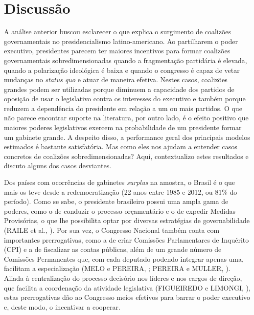 \chapter{Discussão}
\label{chap:discussao}

A análise anterior buscou esclarecer o que explica o surgimento de coalizões governamentais no presidencialismo latino-americano. Ao partilharem o poder executivo, presidentes parecem ter maiores incentivos para formar coalizões governamentais sobredimensionadas quando a fragmentação partidária é elevada, quando a polarização ideológica é baixa e quando o congresso é capaz de vetar mudanças no \textit{status quo} e atuar de maneira efetiva. Nestes casos, coalizões grandes podem ser utilizadas porque diminuem a capacidade dos partidos de oposição de usar o legislativo contra os interesses do executivo e também porque reduzem a dependência do presidente em relação a um ou mais partidos. O que não parece encontrar suporte na literatura, por outro lado, é o efeito positivo que maiores poderes legislativos exercem na probabilidade de um presidente formar um gabinete grande. A despeito disso, a performance geral dos principais modelos estimados é bastante satisfatória. Mas como eles nos ajudam a entender casos concretos de coalizões sobredimensionadas? Aqui, contextualizo estes resultados e discuto alguns dos casos desviantes.

Dos países com ocorrências de gabinetes \textit{surplus} na amostra, o Brasil é o que mais os teve desde a redemocratização (22 anos entre 1985 e 2012, ou 81\% do período). Como se sabe, o presidente brasileiro possui uma ampla gama de poderes, como o de conduzir o processo orçamentário e o de expedir Medidas Provisórias, o que lhe possibilita optar por diversas estratégias de governabilidade (RAILE et al., \citeyear{raile2010}). Por sua vez, o Congresso Nacional também conta com importantes prerrogativas, como a de criar Comissões Parlamentares de Inquérito (CPI) e a de fiscalizar as contas públicas, além de um grande número de Comissões Permanentes que, com cada deputado podendo integrar apenas uma, facilitam a especialização (MELO e PEREIRA, \citeyear{melo2013}; PEREIRA e MULLER, \citeyear{pereira2000}). Aliada à centralização do processo decisório nos líderes e nos cargos de direção, que facilita a coordenação da atividade legislativa (FIGUEIREDO e LIMONGI, \citeyear{figueiredo1999}), estas prerrogativas dão ao Congresso meios efetivos para barrar o poder executivo e, deste modo, o incentivar a cooperar. 

